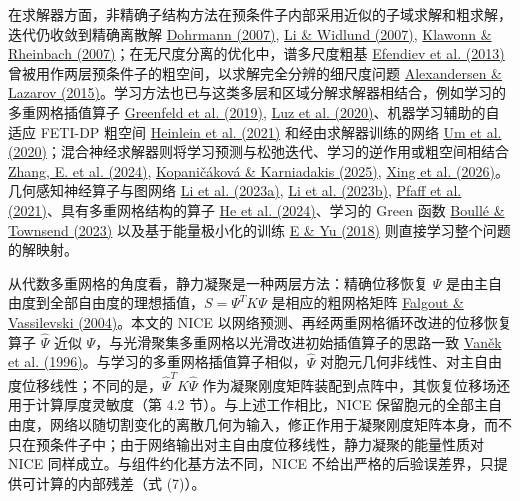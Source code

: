 \documentclass[preprint,12pt,authoryear]{elsarticle}
\begin{document}
在求解器方面，非精确子结构方法在预条件子内部采用近似的子域求解和粗求解，迭代仍收敛到精确离散解 \href{https://doi.org/10.1002/nla.514}{Dohrmann (2007)}, \href{https://doi.org/10.1016/j.cma.2006.03.011}{Li \& Widlund (2007)}, \href{https://doi.org/10.1002/nme.1758}{Klawonn \& Rheinbach (2007)}；在无尺度分离的优化中，谱多尺度粗基 \href{https://doi.org/10.1016/j.jcp.2013.04.045}{Efendiev et al. (2013)} 曾被用作两层预条件子的粗空间，以求解完全分辨的细尺度问题 \href{https://doi.org/10.1016/j.cma.2015.02.028}{Alexandersen \& Lazarov (2015)}。学习方法也已与这类多层和区域分解求解器相结合，例如学习的多重网格插值算子 \href{https://proceedings.mlr.press/v97/greenfeld19a.html}{Greenfeld et al. (2019)}, \href{https://proceedings.mlr.press/v119/luz20a.html}{Luz et al. (2020)}、机器学习辅助的自适应 FETI-DP 粗空间 \href{https://doi.org/10.1137/20M1344913}{Heinlein et al. (2021)} 和经由求解器训练的网络 \href{https://proceedings.neurips.cc/paper/2020/hash/43e4e6a6f341e00671e123714de019a8-Abstract.html}{Um et al. (2020)}；混合神经求解器则将学习预测与松弛迭代、学习的逆作用或粗空间相结合 \href{https://doi.org/10.1038/s42256-024-00910-x}{Zhang, E. et al. (2024)}, \href{https://doi.org/10.1137/24m162861x}{Kopaničáková \& Karniadakis (2025)}, \href{https://doi.org/10.1145/3811333}{Xing et al. (2026)}。几何感知神经算子与图网络 \href{https://www.jmlr.org/papers/v24/23-0064.html}{Li et al. (2023a)}, \href{https://doi.org/10.52202/075280-1556}{Li et al. (2023b)}, \href{https://openreview.net/forum?id=roNqYL0_XP}{Pfaff et al. (2021)}、具有多重网格结构的算子 \href{https://proceedings.iclr.cc/paper_files/paper/2024/hash/eb3c8135137c8a60425a0320869ad87e-Abstract-Conference.html}{He et al. (2024)}、学习的 Green 函数 \href{https://doi.org/10.1007/s10208-022-09556-w}{Boullé \& Townsend (2023)} 以及基于能量极小化的训练 \href{https://doi.org/10.1007/s40304-018-0127-z}{E \& Yu (2018)} 则直接学习整个问题的解映射。

从代数多重网格的角度看，静力凝聚是一种两层方法：精确位移恢复 \(\Psi\) 是由主自由度到全部自由度的理想插值，\(S=\Psi^TK\Psi\) 是相应的粗网格矩阵 \href{https://doi.org/10.1137/S0036142903429742}{Falgout \& Vassilevski (2004)}。本文的 NICE 以网络预测、再经两重网格循环改进的位移恢复算子 \(\widehat\Psi\) 近似 \(\Psi\)，与光滑聚集多重网格以光滑改进初始插值算子的思路一致 \href{https://doi.org/10.1007/BF02238511}{Vaněk et al. (1996)}。与学习的多重网格插值算子相似，\(\widehat\Psi\) 对胞元几何非线性、对主自由度位移线性；不同的是，\(\widehat\Psi^TK\widehat\Psi\) 作为凝聚刚度矩阵装配到点阵中，其恢复位移场还用于计算厚度灵敏度（第 4.2 节）。与上述工作相比，NICE 保留胞元的全部主自由度，网络以随切割变化的离散几何为输入，修正作用于凝聚刚度矩阵本身，而不只在预条件子中；由于网络输出对主自由度位移线性，静力凝聚的能量性质对 NICE 同样成立。与组件约化基方法不同，NICE 不给出严格的后验误差界，只提供可计算的内部残差（式 (7)）。
\end{document}
